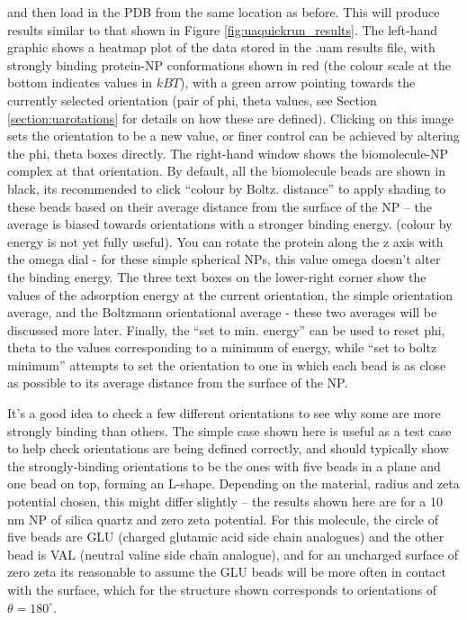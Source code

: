 \documentclass[10pt,a4paper,onecolumn]{report}
\begin{document}
and then load in the PDB from the same location as before. This will produce results similar to that shown in Figure \ref{fig:uaquickrun_results}. The left-hand graphic shows a heatmap plot of the data stored in the .uam results file, with strongly binding protein-NP conformations shown in red (the colour scale at the bottom indicates values in $kBT$), with a green arrow pointing towards the currently selected orientation (pair of phi, theta values, see Section \ref{section:uarotations} for details on how these are defined). Clicking on this image sets the orientation to be a new value, or finer control can be achieved by altering the phi, theta boxes directly. The right-hand window shows the biomolecule-NP complex at that orientation. By default, all the biomolecule beads are shown in black, its recommended to click ``colour by Boltz. distance'' to apply shading to these beads based on their average distance from the surface of the NP -- the average is biased towards orientations with a stronger binding energy. (colour by energy is not yet fully useful).  You can rotate the protein along the z axis with the omega dial - for these simple spherical NPs, this value omega doesn't alter the binding energy. The three text boxes on the lower-right corner show the values of the adsorption energy at the current orientation, the simple orientation average, and the Boltzmann orientational average - these two averages will be discussed more later. Finally, the ``set to min. energy'' can be used to reset phi, theta to the values corresponding to a minimum of energy, while ``set to boltz minimum'' attempts to set the orientation to one in which each bead is as close as possible to its average distance from the surface of the NP.

It's a good idea to check a few different orientations to see why some are more strongly binding than others. The simple case shown here is useful as a test case to help check orientations are being defined correctly, and should typically show the strongly-binding orientations to be the ones with five beads in a plane and one bead on top, forming an L-shape. Depending on the material, radius and zeta potential chosen, this might differ slightly  -- the results shown here are for a 10 nm NP of silica quartz and zero  zeta potential. For this molecule, the circle of five beads are GLU (charged glutamic acid side chain analogues) and the other bead is VAL (neutral valine side chain analogue), and for an uncharged surface of zero zeta its reasonable to assume the GLU beads will be more often in contact with the surface, which for the structure shown corresponds to orientations of $\theta = 180^\circ$. 
\end{document}
